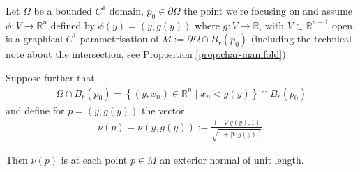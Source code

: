 
\begin{lemma}\label{lem:ext-unit-norm}
	Let $\Omega$ be a bounded $C^{1}$ domain, $p_{0} \in \partial \Omega$ the point we're focusing on and assume $\phi: V \to \mathbb{R}^{n}$ defined by $\phi(y) = (y, g(y))$ where $g: V \to \mathbb{R}$, with $V \subset \mathbb{R}^{n-1}$ open, is a graphical $C^{1}$ parametrisation of $M := \partial \Omega \cap B_{r}(p_{0})$ (including the technical note about the intersection, see Proposition \ref{prop:char-manifold}).

	Suppose further that
	\begin{align*}
		\Omega \cap B_{r}(p_{0}) = \left\{ (y, x_{n}) \in \mathbb{R}^{n} \mid x_{n} < g(y) \right\} \cap B_{r}(p_{0})
	\end{align*}
	and define for $p = (y,g(y))$ the vector
	\begin{align*}
		\nu(p) = \nu(y, g(y)) := \frac{(-\nabla g(y), 1)}{\sqrt{1 + \left| \nabla g(y) \right|^{2}}}.
	\end{align*}

	Then $\nu(p)$ is at each point $p \in M$ an exterior normal of unit length.
\end{lemma}
